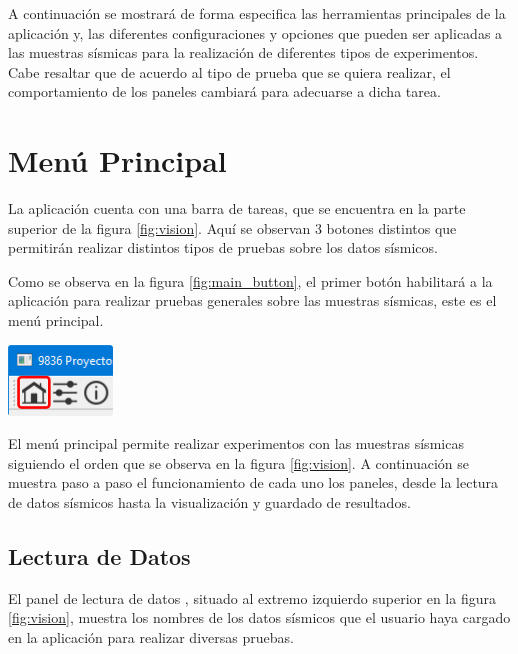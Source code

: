 \documentclass[12pt,oneside,letter]{ol-softwaremanual}
\newcommand*\circled[1]{\tikz[baseline=(char.base)]{
            \node[shape=circle,draw,inner sep=2pt] (char) {#1};}}
\newenvironment{Figure}
  {\par\medskip\noindent\minipage{\linewidth}}
  {\endminipage\par\medskip}
\begin{document}
A continuación se mostrará de forma especifica las herramientas principales de la aplicación y, las diferentes configuraciones y opciones que pueden ser aplicadas a las muestras sísmicas para la realización de diferentes tipos de experimentos. Cabe resaltar que de acuerdo al tipo de prueba que se quiera realizar, el comportamiento de los paneles cambiará para adecuarse a dicha tarea.

\section{Menú Principal}

La aplicación cuenta con una barra de tareas, que se encuentra en la parte superior \circled{1} de la figura \ref{fig:vision}. Aquí se observan 3 botones distintos que permitirán realizar distintos tipos de pruebas sobre los datos sísmicos.

\begin{multicols}{2}

Como se observa en la figura \ref{fig:main_button}, el primer botón habilitará a la aplicación para realizar pruebas generales sobre las muestras sísmicas, este es el menú principal.

\begin{Figure}
    \centering
    \includegraphics[width=0.3\linewidth]{main-tab.png}
    \label{fig:main_button}
\end{Figure}

\end{multicols}

El menú principal permite realizar experimentos con las muestras sísmicas siguiendo el orden que se observa en la figura \ref{fig:vision}. A continuación se muestra paso a paso el funcionamiento de cada uno los paneles, desde la lectura de datos sísmicos hasta la visualización y guardado de resultados.

\subsection{Lectura de Datos}

El panel de lectura de datos \circled{2}, situado al extremo izquierdo superior en la figura \ref{fig:vision}, muestra los nombres de los datos sísmicos que el usuario haya cargado en la aplicación para realizar diversas pruebas.\\
\end{document}
